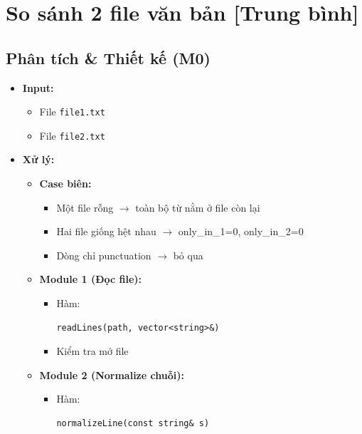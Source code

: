 \section{So sánh 2 file văn bản [Trung bình]}
\subsection{Phân tích \& Thiết kế (M0)}

\begin{itemize}

    \item \textbf{Input:}

    \begin{itemize}
        \item File \texttt{file1.txt}
        \item File \texttt{file2.txt}
    \end{itemize}

    \item \textbf{Xử lý:}

    \begin{itemize}

        \item \textbf{Case biên:}

        \begin{itemize}
            \item Một file rỗng $\rightarrow$ toàn bộ từ nằm ở file còn lại
            \item Hai file giống hệt nhau
            $\rightarrow$
            only\_in\_1=0, only\_in\_2=0
            \item Dòng chỉ punctuation $\rightarrow$ bỏ qua
        \end{itemize}

        \item \textbf{Module 1 (Đọc file):}

        \begin{itemize}
            \item Hàm:
\begin{lstlisting}
readLines(path, vector<string>&)
\end{lstlisting}

            \item Kiểm tra mở file
        \end{itemize}

        \item \textbf{Module 2 (Normalize chuỗi):}

        \begin{itemize}
            \item Hàm:
\begin{lstlisting}
normalizeLine(const string& s)
\end{lstlisting}


\end{itemize}
\end{itemize}
\end{itemize}
